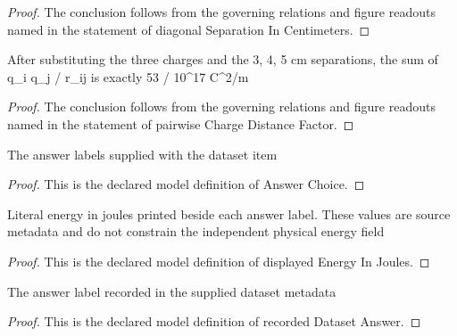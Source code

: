 \begin{proof}
  The conclusion follows from the governing relations and figure readouts named in the statement of diagonal Separation In Centimeters.
\end{proof}
\begin{lemma}
  \label{lem:physics:phyx-mini-0855:phyxminiproblems-problemphyxmini0855-pairwisechargedistancefactor}
  After substituting the three charges and the 3, 4, 5 cm separations, the sum of q\_i q\_j / r\_ij is exactly 53 / 10\textasciicircum{}17 C\textasciicircum{}2/m
\end{lemma}
\begin{proof}
  The conclusion follows from the governing relations and figure readouts named in the statement of pairwise Charge Distance Factor.
\end{proof}
\begin{definition}
  \label{def:physics:phyx-mini-0855:phyxminiproblems-problemphyxmini0855-answerchoice}
  The answer labels supplied with the dataset item
\end{definition}
\begin{proof}
  This is the declared model definition of Answer Choice.
\end{proof}
\begin{definition}
  \label{def:physics:phyx-mini-0855:phyxminiproblems-problemphyxmini0855-displayedenergyinjoules}
  Literal energy in joules printed beside each answer label. These values are source metadata and do not constrain the independent physical energy field
\end{definition}
\begin{proof}
  This is the declared model definition of displayed Energy In Joules.
\end{proof}
\begin{definition}
  \label{def:physics:phyx-mini-0855:phyxminiproblems-problemphyxmini0855-recordeddatasetanswer}
  The answer label recorded in the supplied dataset metadata
\end{definition}
\begin{proof}
  This is the declared model definition of recorded Dataset Answer.
\end{proof}
